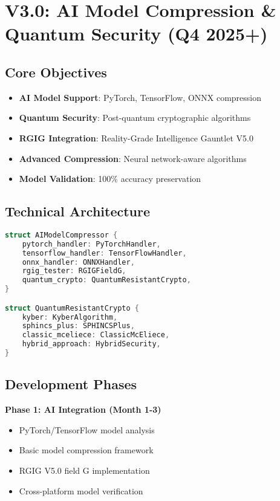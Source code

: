 \documentclass[12pt,a4paper]{article}
\begin{document}
\newpage

\section{V3.0: AI Model Compression \& Quantum Security (Q4 2025+)}

\subsection{Core Objectives}
\begin{itemize}
    \item \textbf{AI Model Support}: PyTorch, TensorFlow, ONNX compression
    \item \textbf{Quantum Security}: Post-quantum cryptographic algorithms
    \item \textbf{RGIG Integration}: Reality-Grade Intelligence Gauntlet V5.0
    \item \textbf{Advanced Compression}: Neural network-aware algorithms
    \item \textbf{Model Validation}: 100\% accuracy preservation
\end{itemize}

\subsection{Technical Architecture}
\begin{lstlisting}[language=C, caption=V3.0 AI Model Architecture]
struct AIModelCompressor {
    pytorch_handler: PyTorchHandler,
    tensorflow_handler: TensorFlowHandler,
    onnx_handler: ONNXHandler,
    rgig_tester: RGIGFieldG,
    quantum_crypto: QuantumResistantCrypto,
}

struct QuantumResistantCrypto {
    kyber: KyberAlgorithm,
    sphincs_plus: SPHINCSPlus,
    classic_mceliece: ClassicMcEliece,
    hybrid_approach: HybridSecurity,
}
\end{lstlisting}

\subsection{Development Phases}
\textbf{Phase 1: AI Integration (Month 1-3)}
\begin{itemize}
    \item PyTorch/TensorFlow model analysis
    \item Basic model compression framework
    \item RGIG V5.0 field G implementation
    \item Cross-platform model verification
\end{itemize}
\end{document}
